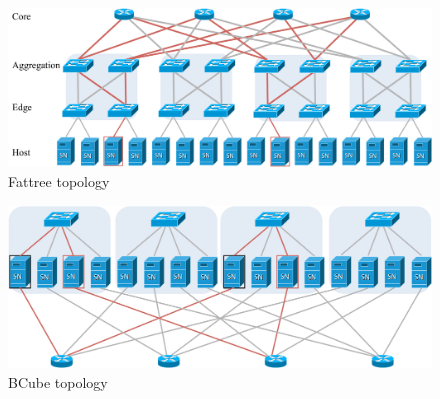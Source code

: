 \begin{figure}[h]
    \begin{center}
    \includegraphics[autoebb, width=350pt]{./img/fattree_topology.pdf}
    \caption{Fattree topology}
    \label{fig:fattree}
    \end{center}
\end{figure}

\begin{figure}[h]
    \begin{center}
    \includegraphics[autoebb, width=350pt]{./img/bcube.pdf}
    \caption{BCube topology}
    \label{fig:bcube}
    \end{center}
\end{figure}


%

